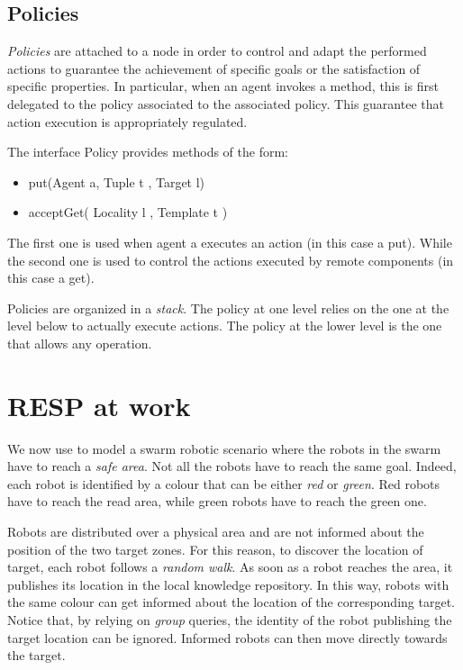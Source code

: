 \documentclass[11pt]{article}
\newcommand{\resp}{\textsf{RESP}}
\begin{document}
\subsection{Policies}
\label{sec:policies}

\emph{Policies} are attached to a node in order to control and adapt the performed actions to guarantee the achievement of specific 
goals or the satisfaction of specific properties. In particular, when an agent invokes a method, this is first delegated to the policy 
associated to the associated policy. This guarantee that \SCEL{} action execution is appropriately regulated.

The interface \textsf{Policy} provides methods of the form:
\begin{itemize}
\item \textsf{put(Agent a, Tuple t , Target l)}
\item \textsf{acceptGet( Locality l , Template t )}
\end{itemize}

The first one is used when agent \textsf{a} executes an action (in this case a \textsf{put}). While the second one is
used  to control the actions executed by remote components (in this case a \textsf{get}).

Policies are organized in a \emph{stack}. The policy at one level relies on the one at the level below to
actually execute \SCEL{} actions. The policy at the lower level is the one that allows any operation.


\section{\resp{} at work}
\label{sec:atwork}


We now use \SCELTS{} to model a swarm robotic scenario where the robots in the swarm have to reach 
a \emph{safe area}. Not all the robots have to reach the same goal. Indeed, 
each robot is identified by a colour that can be either \emph{red} or \emph{green}. Red robots have to
reach the read area, while green robots have to reach the green one. 

Robots are distributed over a physical area and are not informed about the position of the two target zones. For
this reason, to discover the location of target, each robot follows a \emph{random walk}. As soon as a robot reaches the area, it publishes 
its location in the local knowledge repository. In this way, robots with the same colour can get informed 
about the location of the corresponding target. Notice that, by relying on \emph{group} queries, the identity of the 
robot publishing the target location can be ignored. Informed robots can then
move directly towards the target.
\end{document}
